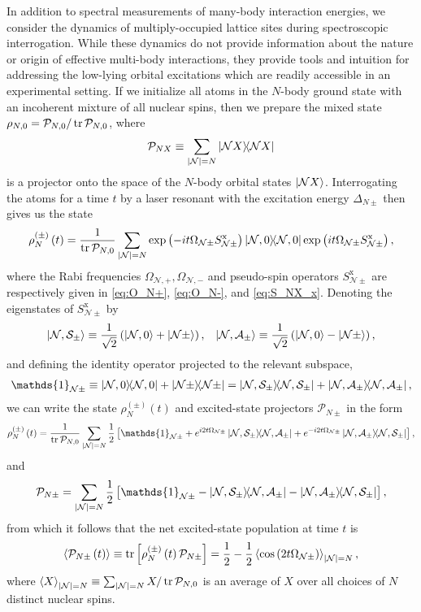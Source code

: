 \documentclass[preprint,showkeys,nofootinbib]{revtex4-1}
\newcommand{\f}{\dfrac} %
\newcommand{\p}[1]{\left(#1\right)} %
\renewcommand{\sp}[1]{\left[#1\right]} %
\newcommand{\bk}{\braket} %
\newcommand{\x}{\text{x}}
\newcommand{\A}{\mathcal{A}}
\newcommand{\N}{\mathcal{N}}
\renewcommand{\P}{\mathcal{P}}
\renewcommand{\S}{\mathcal{S}}
\newcommand{\1}{\mathds{1}}
\begin{document}
In addition to spectral measurements of many-body interaction
energies, we consider the dynamics of multiply-occupied lattice sites
during spectroscopic interrogation.  While these dynamics do not
provide information about the nature or origin of effective multi-body
interactions, they provide tools and intuition for addressing the
low-lying orbital excitations which are readily accessible in an
experimental setting.  If we initialize all atoms in the $N$-body
ground state with an incoherent mixture of all nuclear spins, then we
prepare the mixed state $\rho_{N,0}=\P_{N,0}/\tr\P_{N,0}$, where
\begin{align}
  \P_{NX} \equiv \sum_{\abs{\N}=N}\op{\N X}
  \label{eq:P_NX}
\end{align}
is a projector onto the space of the $N$-body orbital states
$\ket{\N X}$.  Interrogating the atoms for a time $t$ by a laser
resonant with the excitation energy $\Delta_{N\pm}$ then gives us the
state
\begin{align}
  \rho_N^{(\pm)}\p{t} = \f1{\tr\P_{N,0}}
  \sum_{\abs{\N}=N} \exp\p{-it\Omega_{\N\pm}S_{\N\pm}^\x}
  \op{\N,0} \exp\p{it\Omega_{\N\pm}S_{\N\pm}^\x},
\end{align}
where the Rabi frequencies $\Omega_{\N,+},\Omega_{\N,-}$ and
pseudo-spin operators $S_{\N\pm}^\x$ are respectively given in
\eqref{eq:O_N+}, \eqref{eq:O_N-}, and \eqref{eq:S_NX_x}.  Denoting the
eigenstates of $S_{\N\pm}^\x$ by
\begin{align}
  \ket{\N,\S_\pm} \equiv \f1{\sqrt2} \p{\ket{\N,0} + \ket{\N\pm}},
  &&
  \ket{\N,\A_\pm} \equiv \f1{\sqrt2} \p{\ket{\N,0} - \ket{\N\pm}},
\end{align}
and defining the identity operator projected to the relevant subspace,
\begin{align}
  \1_{\N\pm} \equiv \op{\N,0} + \op{\N\pm}
  = \op{\N,\S_\pm} + \op{\N,\A_\pm},
\end{align}
we can write the state $\rho_N^{(\pm)}\p{t}$ and excited-state
projectors $\P_{N\pm}$ in the form
\begin{align}
  \rho_N^{(\pm)}\p{t} = \f1{\tr\P_{N,0}} \sum_{\abs{\N}=N} \f12
  \sp{\1_{\N\pm} + e^{i2t\Omega_{\N\pm}}\op{\N,\S_\pm}{\N,\A_\pm}
    + e^{-i2t\Omega_{\N\pm}}\op{\N,\A_\pm}{\N,\S_\pm}},
  \label{eq:rho_N_pm_t}
\end{align}
and
\begin{align}
  \P_{N\pm} = \sum_{\abs{\N}=N} \f12
  \sp{\1_{\N\pm}-\op{\N,\S_\pm}{\N,\A_\pm}-\op{\N,\A_\pm}{\N,\S_\pm}},
\end{align}
from which it follows that the net excited-state population at time
$t$ is
\begin{align}
  \bk{\P_{N\pm}\p{t}}
  \equiv \tr\sp{\rho_N^{(\pm)}\p{t}\P_{N\pm}}
  = \f12 - \f12 \bk{\cos\p{2t\Omega_{\N\pm}}}_{\abs{\N}=N},
  \label{eq:P_N_pm_t}
\end{align}
where $\bk{X}_{\abs{\N}=N}\equiv\sum_{\abs{\N}=N}X/\tr\P_{N,0}$ is an
average of $X$ over all choices of $N$ distinct nuclear spins.
\end{document}
